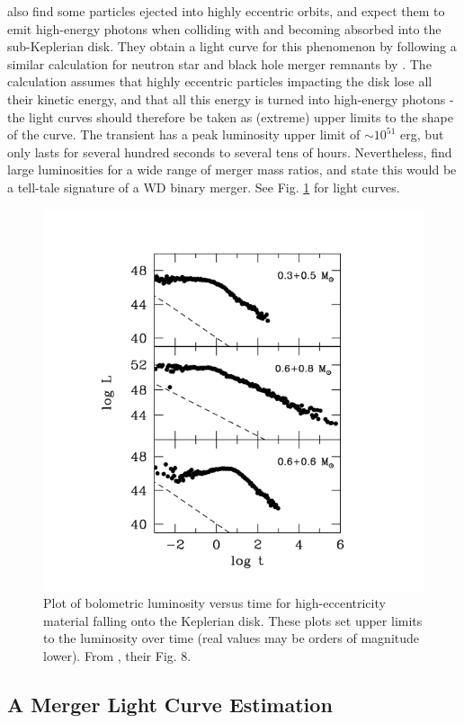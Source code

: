 \citeauthor{loreig09} also find some particles ejected into highly eccentric orbits, and expect them to emit high-energy photons when colliding with and becoming absorbed into the sub-Keplerian disk.  They obtain a light curve for this phenomenon by following a similar calculation for neutron star and black hole merger remnants by \cite{ross07}.  The calculation assumes that highly eccentric particles impacting the disk lose all their kinetic energy, and that all this energy is turned into high-energy photons - the light curves should therefore be taken as (extreme) upper limits to the shape of the curve.  The transient has a peak luminosity upper limit of $\sim 10^{51}$ erg, but only lasts for several hundred seconds to several tens of hours.  Nevertheless, \citeauthor{loreig09} find large luminosities for a wide range of merger mass ratios, and state this would be a tell-tale signature of a WD binary merger.  See Fig. \ref{fallbackacc} for light curves.

\begin{figure}
\centerline{\includegraphics[width=0.8\hsize]{fallbackacc.png}}
\caption{Plot of bolometric luminosity versus time for high-eccentricity material falling onto the Keplerian disk.  These plots set upper limits to the luminosity over time (real values may be orders of magnitude lower).  From \cite{loreig09}, their Fig. 8.}
\label{fallbackacc}
\end{figure}

\subsection{A Merger Light Curve Estimation}
\label{ssec:lightcurveestimation}

